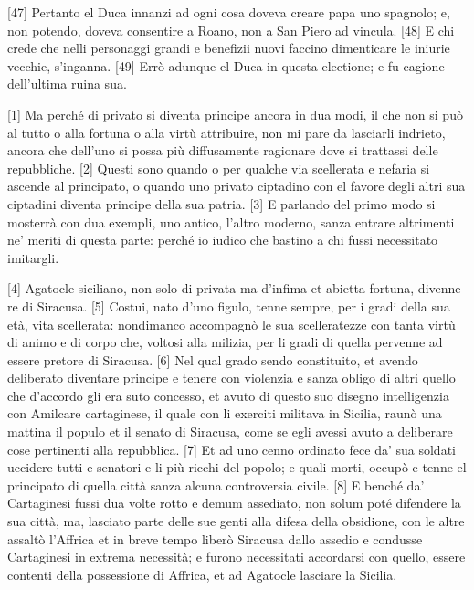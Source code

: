 {[}47{]} Pertanto el Duca innanzi ad ogni cosa doveva creare papa uno
spagnolo; e, non potendo, doveva consentire a Roano, non a San Piero ad
vincula. {[}48{]} E chi crede che nelli personaggi grandi e benefizii
nuovi faccino dimenticare le iniurie vecchie, s'inganna. {[}49{]} Errò
adunque el Duca in questa electione; e fu cagione dell'ultima ruina sua.


{[}1{]} Ma perché di privato si diventa principe ancora in dua modi, il
che non si può al tutto o alla fortuna o alla virtù attribuire, non mi
pare da lasciarli indrieto, ancora che dell'uno si possa più
diffusamente ragionare dove si trattassi delle repubbliche. {[}2{]}
Questi sono quando o per qualche via scellerata e nefaria si ascende al
principato, o quando uno privato ciptadino con el favore degli altri sua
ciptadini diventa principe della sua patria. {[}3{]} E parlando del
primo modo si mosterrà con dua exempli, uno antico, l'altro moderno,
sanza entrare altrimenti ne' meriti di questa parte: perché io iudico
che bastino a chi fussi necessitato imitargli.

{[}4{]} Agatocle siciliano, non solo di privata ma d'infima et abietta
fortuna, divenne re di Siracusa. {[}5{]} Costui, nato d'uno figulo,
tenne sempre, per i gradi della sua età, vita scellerata: nondimanco
accompagnò le sua scelleratezze con tanta virtù di animo e di corpo che,
voltosi alla milizia, per li gradi di quella pervenne ad essere pretore
di Siracusa. {[}6{]} Nel qual grado sendo constituito, et avendo
deliberato diventare principe e tenere con violenzia e sanza obligo di
altri quello che d'accordo gli era suto concesso, et avuto di questo suo
disegno intelligenzia con Amilcare cartaginese, il quale con li exerciti
militava in Sicilia, raunò una mattina il populo et il senato di
Siracusa, come se egli avessi avuto a deliberare cose pertinenti alla
repubblica. {[}7{]} Et ad uno cenno ordinato fece da' sua soldati
uccidere tutti e senatori e li più ricchi del popolo; e quali morti,
occupò e tenne el principato di quella città sanza alcuna controversia
civile. {[}8{]} E benché da' Cartaginesi fussi dua volte rotto e demum
assediato, non solum poté difendere la sua città, ma, lasciato parte
delle sue genti alla difesa della obsidione, con le altre assaltò
l'Affrica et in breve tempo liberò Siracusa dallo assedio e condusse
Cartaginesi in extrema necessità; e furono necessitati accordarsi con
quello, essere contenti della possessione di Affrica, et ad Agatocle
lasciare la Sicilia.

